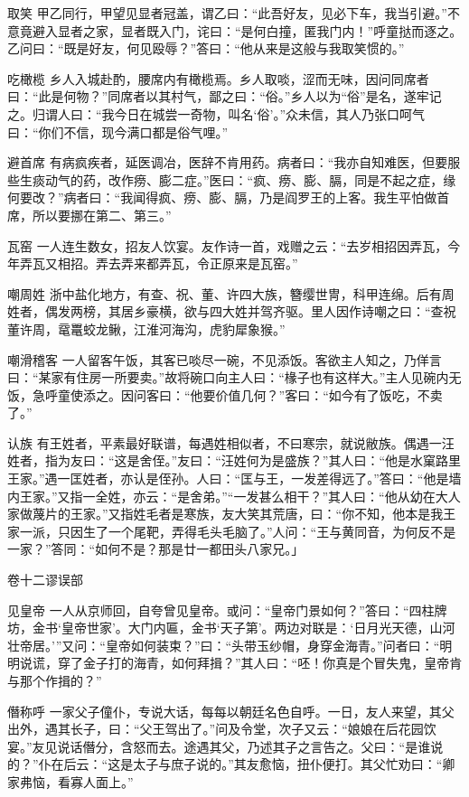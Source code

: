 \documentclass[12pt,UTF8]{ctexbook}
\begin{document}
取笑
甲乙同行，甲望见显者冠盖，谓乙曰：“此吾好友，见必下车，我当引避。”不意竟避入显者之家，显者既入门，诧曰：“是何白撞，匿我门内！”呼童挞而逐之。乙问曰：“既是好友，何见殴辱？”答曰：“他从来是这般与我取笑惯的。”

吃橄榄
乡人入城赴酌，腰席内有橄榄焉。乡人取啖，涩而无味，因问同席者曰：“此是何物？”同席者以其村气，鄙之曰：“俗。”乡人以为“俗”是名，遂牢记之。归谓人曰：“我今日在城尝一奇物，叫名‘俗’。”众未信，其人乃张口呵气曰：“你们不信，现今满口都是俗气哩。”

避首席
有病疯疾者，延医调冶，医辞不肯用药。病者曰：“我亦自知难医，但要服些生痰动气的药，改作痨、膨二症。”医曰：“疯、痨、膨、膈，同是不起之症，缘何要改？”病者曰：“我闻得疯、痨、膨、膈，乃是阎罗王的上客。我生平怕做首席，所以要挪在第二、第三。”

瓦窑
一人连生数女，招友人饮宴。友作诗一首，戏赠之云：“去岁相招因弄瓦，今年弄瓦又相招。弄去弄来都弄瓦，令正原来是瓦窑。”

嘲周姓
浙中盐化地方，有查、祝、董、许四大族，簪缨世冑，科甲连绵。后有周姓者，偶发两榜，其居乡豪横，欲与四大姓并驾齐驱。里人因作诗嘲之曰：“查祝董许周，鼋鼍蛟龙鳅，江淮河海沟，虎豹犀象猴。”

嘲滑稽客
一人留客午饭，其客已啖尽一碗，不见添饭。客欲主人知之，乃佯言曰：“某家有住房一所要卖。”故将碗口向主人曰：“椽子也有这样大。”主人见碗内无饭，急呼童使添之。因问客曰：“他要价值几何？”客曰：“如今有了饭吃，不卖了。”

认族
有王姓者，平素最好联谱，每遇姓相似者，不曰寒宗，就说敝族。偶遇一汪姓者，指为友曰：“这是舍侄。”友曰：“汪姓何为是盛族？”其人曰：“他是水窠路里王家。”遇一匡姓者，亦认是侄孙。人曰：“匡与王，一发差得远了。”答曰：“他是墙内王家。”又指一全姓，亦云：“是舍弟。”“一发甚么相干？”其人曰：“他从幼在大人家做蔑片的王家。”又指姓毛者是寒族，友大笑其荒唐，曰：“你不知，他本是我王家一派，只因生了一个尾靶，弄得毛头毛脑了。”人问：“王与黄同音，为何反不是一家？”答同：“如何不是？那是廿一都田头八家兄。」

卷十二谬误部

见皇帝
一人从京师回，自夸曾见皇帝。或问：“皇帝门景如何？”答曰：“四柱牌坊，金书‘皇帝世家’。大门内匾，金书‘天子第’。两边对联是：‘日月光天德，山河壮帝居。’”又问：“皇帝如何装束？”曰：“头带玉纱帽，身穿金海青。”问者曰：“明明说谎，穿了金子打的海青，如何拜揖？”其人曰：“呸！你真是个冒失鬼，皇帝肯与那个作揖的？”

僭称呼
一家父子僮仆，专说大话，每每以朝廷名色自呼。一日，友人来望，其父出外，遇其长子，曰：“父王驾出了。”问及令堂，次子又云：“娘娘在后花园饮宴。”友见说话僭分，含怒而去。途遇其父，乃述其子之言告之。父曰：“是谁说的？”仆在后云：“这是太子与庶子说的。”其友愈恼，扭仆便打。其父忙劝曰：“卿家弗恼，看寡人面上。”
\end{document}
